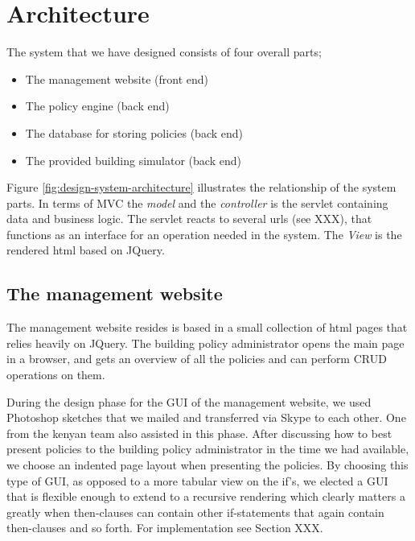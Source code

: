 \section{Architecture}
The system that we have designed consists of four overall parts;
\begin{itemize}
	\item The management website (front end)
	\item The policy engine (back end)
	\item The database for storing policies (back end)
	\item The provided building simulator (back end)
\end{itemize}

Figure \ref{fig:design-system-architecture} illustrates the relationship of the system parts. In terms of MVC the \textit{model} and the \textit{controller} is the servlet containing data and business logic. The servlet reacts to several urls (see XXX), that functions as an interface for an operation needed in the system. The \textit{View} is the rendered html based on JQuery.

\begin{figure}[t]
\end{figure}

\subsection{The management website}
The management website resides is based in a small collection of html pages that relies heavily on JQuery. The building policy administrator opens the main page in a browser, and gets an overview of all the policies and can perform CRUD operations on them.

During the design phase for the GUI of the management website, we used Photoshop sketches that we mailed and transferred via Skype to each other. One from the kenyan team also assisted in this phase. After discussing how to best present policies to the building policy administrator in the time we had available, we choose an indented page layout when presenting the policies. By choosing this type of GUI, as opposed to a more tabular view on the if's, we elected a GUI that is flexible enough to extend to a recursive rendering which clearly matters a greatly when then-clauses can contain other if-statements that again contain then-clauses and so forth. For implementation see Section XXX.

